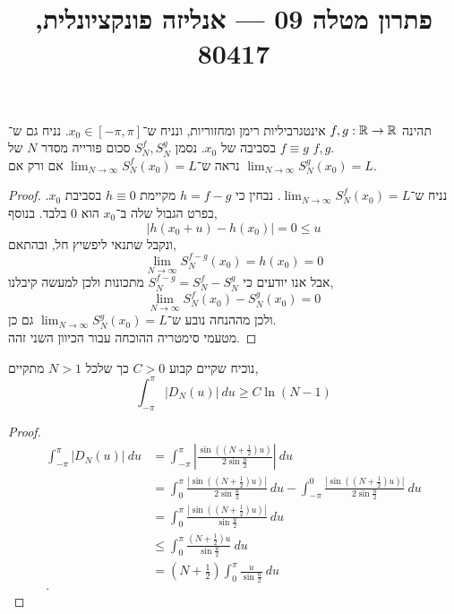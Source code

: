 
\title{פתרון מטלה 09 --- אנליזה פונקציונלית, 80417}

\DeclareMathOperator\sgn{sgn}


\maketitle
\maketitleprint[teal]

\question{}
תהינה $f, g : \mathbb{R} \to \mathbb{R}$ אינטגרביליות רימן ומחזוריות, ונניח ש־$x_0 \in [-\pi, \pi]$.
נניח גם ש־$f \equiv g$ בסביבה של $x_0$.
נסמן $S_N^f, S_N^g$ סכום פורייה מסדר $N$ של $f, g$. \\
נראה ש־$\lim_{N \to \infty} S_N^f(x_0) = L$ אם ורק אם $\lim_{N \to \infty} S_N^g(x_0) = L$.
\begin{proof}
	נניח ש־$\lim_{N \to \infty} S_N^f(x_0) = L$.
	נבחין כי $h = f - g$ מקיימת $h \equiv 0$ בסביבת $x_0$.
	בפרט הגבול שלה ב־$x_0$ הוא $0$ בלבד.
	בנוסף,
	\[
		|h(x_0 + u) - h(x_0)|
		= 0 \le u
	\]
	ונקבל שתנאי ליפשיץ חל, ובהתאם,
	\[
		\lim_{N \to \infty} S_N^{f - g}(x_0)
		= h(x_0)
		= 0
	\]
	אבל אנו יודעים כי $S_N^{f - g} = S_N^f - S_N^g$ מתכונות ולכן למעשה קיבלנו,
	\[
		\lim_{N \to \infty} S_N^f(x_0) - S_N^g(x_0)
		= 0
	\]
	ולכן מההנחה נובע ש־$\lim_{N \to \infty} S_N^g(x_0) = L$ גם כן. \\
	מטעמי סימטריה ההוכחה עבור הכיוון השני זהה.
\end{proof}

\question{}
נוכיח שקיים קבוע $C > 0$ כך שלכל $N > 1$ מתקיים,
\[
	\int_{-\pi}^{\pi} | D_N(u) |\ du
	\ge C \ln(N - 1)
\]
\begin{proof}
	\begin{align*}
		\int_{-\pi}^{\pi} | D_N(u) |\ du
		& = \int_{-\pi}^{\pi} \left\lvert \frac{\sin((N + \frac{1}{2}) u)}{2 \sin \frac{u}{2}} \right\rvert\ du \\
		& = \int_{0}^{\pi} \frac{|\sin((N + \frac{1}{2}) u)|}{2 \sin \frac{u}{2}}\ du - \int_{-\pi}^{0} \frac{|\sin((N + \frac{1}{2}) u)|}{2 \sin \frac{u}{2}}\ du \\
		& = \int_{0}^{\pi} \frac{|\sin((N + \frac{1}{2}) u)|}{\sin \frac{u}{2}}\ du \\
		& \le \int_{0}^{\pi} \frac{(N + \frac{1}{2}) u}{\sin \frac{u}{2}}\ du \\
		& = (N + \frac{1}{2}) \int_{0}^{\pi} \frac{u}{\sin \frac{u}{2}}\ du \\
	.\end{align*}
\end{proof}


